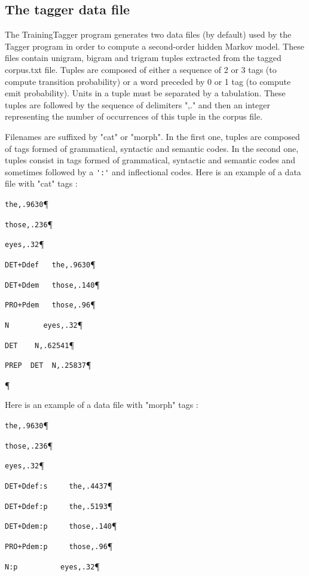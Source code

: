 \subsection{The tagger data file}
\label{section-training-dict}
The TrainingTagger program generates two data files (by default) used by the Tagger program in order
to compute a second-order hidden Markov model. 
These files contain unigram, bigram and trigram tuples extracted from the tagged corpus.txt file. Tuples are
composed of either a sequence of 2 or 3 tags (to compute transition probability) or a word preceded by
0 or 1 tag (to compute emit probability). Units in a tuple must be separated by a tabulation.
These tuples are followed by the sequence of delimiters ",." and then an integer representing the number of
occurrences of this tuple in the corpus file. 

\bigskip
\noindent Filenames are suffixed by "cat" or "morph". In the first one, tuples are composed of tags formed of grammatical, 
syntactic and semantic codes. In the second one, tuples consist in tags formed of grammatical, syntactic and semantic 
codes and sometimes followed by a \verb+':'+ and inflectional codes.
Here is an example of a data file with "cat" tags : 

\bigskip
\verb+the,.9630+\P

\verb+those,.236+\P

\verb+eyes,.32+\P

\verb$DET+Ddef	 the,.9630$\P

\verb$DET+Ddem	 those,.140$\P

\verb$PRO+Pdem	 those,.96$\P

\verb+N		   eyes,.32+\P

\verb+DET	 N,.62541+\P

\verb+PREP	DET  N,.25837+\P

\P

\bigskip

\noindent Here is an example of a data file with "morph" tags :

\bigskip
\verb+the,.9630+\P

\verb+those,.236+\P

\verb+eyes,.32+\P

\verb$DET+Ddef:s	 the,.4437$\P

\verb$DET+Ddef:p	 the,.5193$\P

\verb$DET+Ddem:p	 those,.140$\P

\verb$PRO+Pdem:p	 those,.96$\P

\verb+N:p		   eyes,.32+\P

